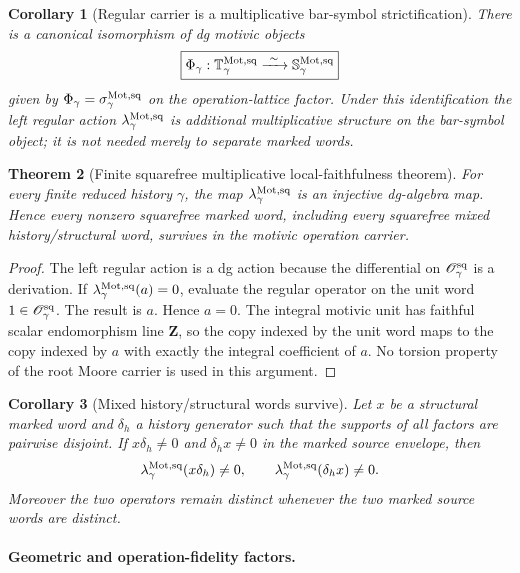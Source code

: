 \documentclass[11pt]{article}
\newtheorem{theorem}{Theorem}[section]
\newtheorem{corollary}[theorem]{Corollary}
\theoremstyle{remark}
\newcommand{\Z}{\mathbf Z}
\newcommand{\Mot}{\mathrm{Mot}}
\begin{document}
\begin{corollary}[Regular carrier is a multiplicative bar-symbol strictification]
\label{P2M-cor:v23-regular-is-bar-strictification}
There is a canonical isomorphism of dg motivic objects
\[
 \boxed{
 \Phi_\gamma:
 \mathbb T_\gamma^{\Mot,\rm sq}
 \xrightarrow{\ \sim\ }
 \mathbb S_\gamma^{\Mot,\rm sq}}
\]
given by \(\Phi_\gamma=\sigma_\gamma^{\Mot,\rm sq}\) on the operation-lattice
factor.  Under this identification the left regular action
\(\lambda_\gamma^{\Mot,\rm sq}\) is additional multiplicative structure on the
bar-symbol object; it is not needed merely to separate marked words.
\end{corollary}

\begin{theorem}[Finite squarefree multiplicative local-faithfulness theorem]
\label{P2M-thm:v22-squarefree-local-faithfulness}
For every finite reduced history $\gamma$, the map
$\lambda_{\gamma}^{\Mot,\rm sq}$ is an injective dg-algebra map.  Hence every
nonzero squarefree marked word, including every squarefree mixed
history/structural word, survives in the motivic operation carrier.
\end{theorem}

\begin{proof}
The left regular action is a dg action because the differential on
$\mathscr O_{\gamma}^{\rm sq}$ is a derivation.  If
$\lambda_{\gamma}^{\Mot,\rm sq}(a)=0$, evaluate the regular operator on the unit
word $1\in\mathscr O_{\gamma}^{\rm sq}$.  The result is $a$.  Hence $a=0$.
The integral motivic unit has faithful scalar endomorphism line $\Z$, so the
copy indexed by the unit word maps to the copy indexed by $a$ with exactly the
integral coefficient of $a$.  No torsion property of the root Moore carrier is
used in this argument.
\end{proof}

\begin{corollary}[Mixed history/structural words survive]
\label{P2M-cor:v22-mixed-words-survive}
Let $x$ be a structural marked word and $\delta_h$ a history generator such
that the supports of all factors are pairwise disjoint.  If
$x\delta_h\ne0$ and $\delta_hx\ne0$ in the marked source envelope, then
\[
 \lambda_{\gamma}^{\Mot,\rm sq}(x\delta_h)\ne0,
 \qquad
 \lambda_{\gamma}^{\Mot,\rm sq}(\delta_hx)\ne0.
\]
Moreover the two operators remain distinct whenever the two marked source words
are distinct.
\end{corollary}

\paragraph{Geometric and operation-fidelity factors.}
\end{document}
